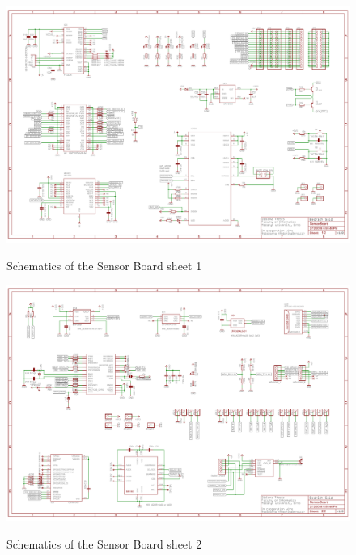 \begin{figure}
	\centering
	\includegraphics[angle=90, scale=1]{img/sch1.pdf}
	\label{sch1}
	\caption{Schematics of the Sensor Board sheet 1}
\end{figure}

\begin{figure}
	\centering
	\includegraphics[angle=90, scale=1]{img/sch2.pdf}
	\label{sch2}
	\caption{Schematics of the Sensor Board sheet 2}
\end{figure}

